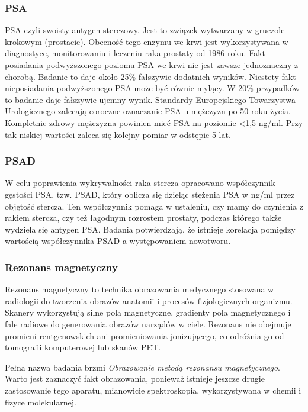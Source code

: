 \documentclass[a4paper,11pt,twoside]{report}
\theoremstyle{definition}
\begin{document}
\subsubsection{PSA}
PSA czyli swoisty antygen sterczowy. Jest to związek wytwarzany w gruczole krokowym (prostacie). Obecność tego enzymu we krwi jest wykorzystywana w diagnostyce, monitorowaniu i leczeniu raka prostaty od 1986 roku. Fakt posiadania podwyższonego poziomu PSA we krwi nie jest zawsze jednoznaczny z chorobą. Badanie to daje około 25\% fałszywie dodatnich wyników. Niestety fakt nieposiadania podwyższonego PSA może być równie mylący. W 20\% przypadków to badanie daje fałszywie ujemny wynik. Standardy Europejskiego Towarzystwa Urologicznego zalecają coroczne oznaczanie PSA u mężczyzn po 50 roku życia. 
Kompletnie zdrowy mężczyzna powinien mieć PSA na poziomie <1,5 ng/ml. Przy tak niskiej wartości zaleca się kolejny pomiar w odstępie 5 lat. 

\subsubsection{PSAD}
W celu poprawienia wykrywalności raka stercza opracowano współczynnik gęstości PSA, tzw.
PSAD, który oblicza się dzieląc stężenia PSA w ng/ml przez objętość stercza. Ten współczynnik pomaga w ustaleniu, czy mamy do czynienia z rakiem stercza, czy też łagodnym rozrostem prostaty, podczas którego także wydziela się antygen PSA. Badania potwierdzają, że istnieje korelacja pomiędzy wartością współczynnika PSAD a występowaniem nowotworu.

\subsubsection{Rezonans magnetyczny}
Rezonans magnetyczny to technika obrazowania medycznego stosowana w radiologii do tworzenia obrazów anatomii i procesów fizjologicznych organizmu. Skanery wykorzystują silne pola magnetyczne, gradienty pola magnetycznego i fale radiowe do generowania obrazów narządów w ciele. Rezonans nie obejmuje promieni rentgenowskich ani promieniowania jonizującego, co odróżnia go od tomografii komputerowej lub  skanów PET.
\par
Pełna nazwa badania brzmi \textit{Obrazowanie metodą rezonansu magnetycznego}. Warto jest zaznaczyć fakt obrazowania, ponieważ istnieje jeszcze drugie zastosowanie tego aparatu, mianowicie spektroskopia, wykorzystywana w chemii i fizyce molekularnej. 
\end{document}
